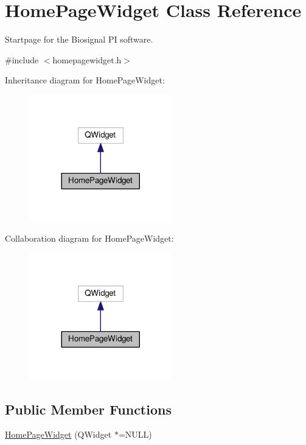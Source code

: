 \hypertarget{classHomePageWidget}{}\section{Home\+Page\+Widget Class Reference}
\label{classHomePageWidget}


Startpage for the Biosignal PI software.  




{\ttfamily \#include $<$homepagewidget.\+h$>$}



Inheritance diagram for Home\+Page\+Widget\+:
\nopagebreak
\begin{figure}[H]
\begin{center}
\leavevmode
\includegraphics[width=176pt]{classHomePageWidget__inherit__graph}
\end{center}
\end{figure}


Collaboration diagram for Home\+Page\+Widget\+:
\nopagebreak
\begin{figure}[H]
\begin{center}
\leavevmode
\includegraphics[width=176pt]{classHomePageWidget__coll__graph}
\end{center}
\end{figure}
\subsection*{Public Member Functions}
\begin{DoxyCompactItemize}
\item 
\hyperlink{classHomePageWidget_a72947da81d3ac3ce6edc9da05fd809ac}{Home\+Page\+Widget} (Q\+Widget $\ast$=N\+U\+LL)
\end{DoxyCompactItemize}


